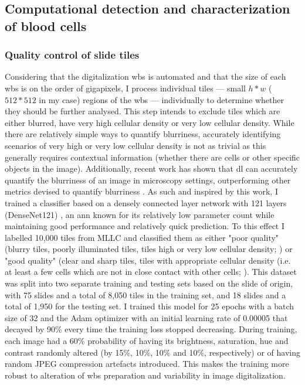 \subsection{Computational detection and characterization of blood cells}

\subsubsection{Quality control of slide tiles}

Considering that the digitalization \ac{wbs} is automated and that the size of each \ac{wbs} is on the order of gigapixels, I process individual tiles --- small $h*w$ ($512*512$ in my case) regions of the \ac{wbs} --- individually to determine whether they should be further analysed. This step intends to exclude tiles which are either blurred, have very high cellular density or very low cellular density. While there are relatively simple ways to quantify blurriness, accurately identifying scenarios of very high or very low cellular density is not as trivial as this generally requires contextual information (whether there are cells or other specific objects in the image). Additionally, recent work has shown that \ac{dl} can accurately quantify the blurriness of an image in microscopy settings, outperforming other metrics devised to quantify blurriness \cite{Yang2018-ve}. As such and inspired by this work, I trained a classifier based on a densely connected layer network with 121 layers (DenseNet121) \cite{huang2017densely}, an \ac{ann} known for its relatively low parameter count while maintaining good performance and relatively quick prediction. To this effect I labelled 10,000 tiles from MLLC and classified them as either "poor quality" (blurry tiles, poorly illuminated tiles, tiles high or very low cellular density; ) or "good quality" (clear and sharp tiles, tiles with appropriate cellular density (i.e. at least a few cells which are not in close contact with other cells; ). This dataset was split into two separate training and testing sets based on the slide of origin, with 75 slides and a total of 8,050 tiles in the training set, and 18 slides and a total of 1,950 for the testing set. I trained this model for 25 epochs with a batch size of 32 and the Adam optimizer with an initial learning rate of 0.00005 that decayed by 90\% every time the training loss stopped decreasing. During training, each image had a 60\% probability of having its brightness, saturation, hue and contrast randomly altered (by 15\%, 10\%, 10\% and 10\%, respectively) or of having random JPEG compression artefacts introduced. This makes the training more robust to alteration of \ac{wbs} preparation and variability in image digitalization.

